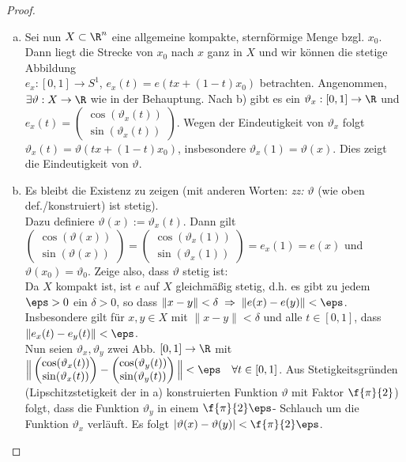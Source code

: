 \documentclass{mycourse}
\newcommand{\tta}{\vartheta}
\begin{document}
\begin{lem}[Hochhebungslemma]
\begin{proof}
\begin{enumerate}[a)]
	\item 
Sei nun $X \subset \R^n$ eine allgemeine kompakte, sternförmige Menge bzgl. $x_0$. \\  Dann liegt die Strecke von $x_0$ nach $x$ ganz in $X$ und wir können die stetige Abbildung \\ $e_x: [0,1] \to S^1$,  $ e_x(t) = e(tx + (1-t) x_0)$ betrachten. Angenommen, $\exists \tta: X \to \R$ wie in der Behauptung. Nach b) gibt es ein $\tta_x: [0,1] \to \R$ und $e_x(t) = \begin{pmatrix} \cos(\tta_x(t)) \\ \sin(\tta_x(t)) \end{pmatrix}$. Wegen der Eindeutigkeit von $\tta_x$ folgt  $\tta_x(t) = \tta(tx + (1-t) x_0)$, insbesondere $\tta_x(1) = \tta(x)$. Dies zeigt die Eindeutigkeit von $\tta$.

	\item 
Es bleibt die Existenz zu zeigen (mit anderen Worten: \emph{zz:} $\tta$ (wie oben def./konstruiert) ist stetig). \\
Dazu definiere $\tta(x) := \tta_x(t)$. Dann gilt $\begin{pmatrix} \cos(\tta(x)) \\ \sin(\tta(x)) \end{pmatrix} = \begin{pmatrix} \cos(\tta_x(1)) \\ \sin(\tta_x(1)) \end{pmatrix} = e_x(1) = e(x)$ und $\tta(x_0) = \tta_0$. Zeige also, dass $\tta$ stetig ist: \\
Da $X$ kompakt ist, ist $e$ auf $X$ gleichmäßig stetig, d.h. es gibt zu jedem $\eps > 0$ ein $\delta > 0$, so dass $\| x - y \| < \delta \; \Rightarrow \; \| e(x) - e(y) \| < \eps$. Insbesondere gilt für $x,y \in X$ mit $\| x - y \| < \delta$ und alle $t \in [0,1]$, dass $\| e_x(t) - e_y(t) \| < \eps$. \\
Nun seien $\tta_x,  \tta_y$ zwei Abb. $[0,1] \to \R$ mit $\Big \| \begin{pmatrix} \cos(\tta_x(t)) \\ \sin(\tta_x(t)) \end{pmatrix} - \begin{pmatrix} \cos(\tta_y(t)) \\ \sin(\tta_y(t)) \end{pmatrix} \Big \| < \eps \quad \forall t \in [0,1]$. Aus Stetigkeitsgründen (Lipschitzstetigkeit der in a) konstruierten Funktion $\tta$ mit Faktor $\f{\pi}{2}$) folgt, dass die Funktion $\tta_y$ in einem $\f{\pi}{2} \eps$- \glqq Schlauch \grqq um die Funktion $\tta_x$ verläuft. Es folgt $|\tta(x) - \tta(y)| < \f{\pi}{2} \eps$.
\end{enumerate}
\end{proof}
\end{lem}
\end{document}
